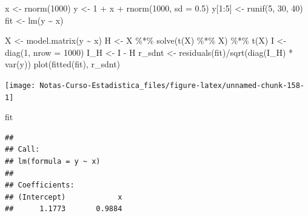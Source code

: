 \documentclass[
  12pt,
]{book}
\newenvironment{Shaded}{\begin{snugshade}}{\end{snugshade}}
\newcommand{\AttributeTok}[1]{\textcolor[rgb]{0.77,0.63,0.00}{#1}}
\newcommand{\DecValTok}[1]{\textcolor[rgb]{0.00,0.00,0.81}{#1}}
\newcommand{\FloatTok}[1]{\textcolor[rgb]{0.00,0.00,0.81}{#1}}
\newcommand{\FunctionTok}[1]{\textcolor[rgb]{0.00,0.00,0.00}{#1}}
\newcommand{\NormalTok}[1]{#1}
\newcommand{\OtherTok}[1]{\textcolor[rgb]{0.56,0.35,0.01}{#1}}
\newcommand{\SpecialCharTok}[1]{\textcolor[rgb]{0.00,0.00,0.00}{#1}}
\begin{document}
\begin{Shaded}
\begin{Highlighting}[]
\NormalTok{x }\OtherTok{\textless{}{-}} \FunctionTok{rnorm}\NormalTok{(}\DecValTok{1000}\NormalTok{)}
\NormalTok{y }\OtherTok{\textless{}{-}} \DecValTok{1} \SpecialCharTok{+}\NormalTok{ x }\SpecialCharTok{+} \FunctionTok{rnorm}\NormalTok{(}\DecValTok{1000}\NormalTok{, }\AttributeTok{sd =} \FloatTok{0.5}\NormalTok{)}
\NormalTok{y[}\DecValTok{1}\SpecialCharTok{:}\DecValTok{5}\NormalTok{] }\OtherTok{\textless{}{-}} \FunctionTok{runif}\NormalTok{(}\DecValTok{5}\NormalTok{, }\DecValTok{30}\NormalTok{, }\DecValTok{40}\NormalTok{)}
\NormalTok{fit }\OtherTok{\textless{}{-}} \FunctionTok{lm}\NormalTok{(y }\SpecialCharTok{\textasciitilde{}}\NormalTok{ x)}

\NormalTok{X }\OtherTok{\textless{}{-}} \FunctionTok{model.matrix}\NormalTok{(y }\SpecialCharTok{\textasciitilde{}}\NormalTok{ x)}
\NormalTok{H }\OtherTok{\textless{}{-}}\NormalTok{ X }\SpecialCharTok{\%*\%} \FunctionTok{solve}\NormalTok{(}\FunctionTok{t}\NormalTok{(X) }\SpecialCharTok{\%*\%}\NormalTok{ X) }\SpecialCharTok{\%*\%} \FunctionTok{t}\NormalTok{(X)}
\NormalTok{I }\OtherTok{\textless{}{-}} \FunctionTok{diag}\NormalTok{(}\DecValTok{1}\NormalTok{, }\AttributeTok{nrow =} \DecValTok{1000}\NormalTok{)}
\NormalTok{I\_H }\OtherTok{\textless{}{-}}\NormalTok{ I }\SpecialCharTok{{-}}\NormalTok{ H}
\NormalTok{r\_sdnt }\OtherTok{\textless{}{-}} \FunctionTok{residuals}\NormalTok{(fit)}\SpecialCharTok{/}\FunctionTok{sqrt}\NormalTok{(}\FunctionTok{diag}\NormalTok{(I\_H) }\SpecialCharTok{*} \FunctionTok{var}\NormalTok{(y))}
\FunctionTok{plot}\NormalTok{(}\FunctionTok{fitted}\NormalTok{(fit), r\_sdnt)}
\end{Highlighting}
\end{Shaded}

\begin{center}\texttt{[image: Notas-Curso-Estadistica\_files/figure-latex/unnamed-chunk-158-1]} \end{center}

\begin{Shaded}
\begin{Highlighting}[]
\NormalTok{fit}
\end{Highlighting}
\end{Shaded}

\begin{verbatim}
## 
## Call:
## lm(formula = y ~ x)
## 
## Coefficients:
## (Intercept)            x  
##      1.1773       0.9884
\end{verbatim}
\end{document}
